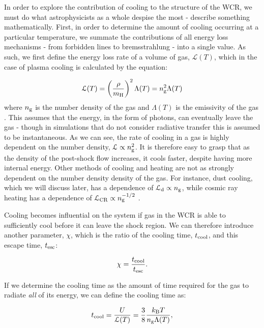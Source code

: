 In order to explore the contribution of cooling to the structure of the WCR, we must do what astrophysicists as a whole despise the most - describe something mathematically.
First, in order to determine the amount of cooling occurring at a particular temperature, we summate the contributions of all energy loss mechanisms - from forbidden lines to bremsstrahlung - into a single value.
As such, we first define the energy loss rate of a volume of gas, $\mathcal{L}(T)$, which in the case of plasma cooling is calculated by the equation:

\begin{equation}
  \label{eq:energylossrate}
  \mathcal{L}(T) = \left(\frac{\rho}{m_\text{H}}\right)^2 \Lambda(T) = n_\text{g}^2 \Lambda(T)
\end{equation}
\noindent
where $n_\text{g}$ is the number density of the gas and $\Lambda(T)$ is the emissivity of the gas \parencite{stevens_colliding_1992}.
This assumes that the energy, in the form of photons, can eventually leave the gas - though in simulations that do not consider radiative transfer this is assumed to be instantaneous.
As we can see, the rate of cooling in a gas is highly dependent on the number density, $\mathcal{L} \propto n_\text{g}^2$. 
It is therefore easy to grasp that as the density of the post-shock flow increases, it cools faster, despite having more internal energy.
Other methods of cooling and heating are not as strongly dependent on the number density density of the gas.
For instance, dust cooling, which we will discuss later, has a dependence of $\mathcal{L}_\text{d} \propto n_\text{g}$, while cosmic ray heating has a dependence of $\mathcal{L}_\text{CR} \propto n_\text{g}^{-1/2}$ \parencite{wienerCosmicRayHeating2013}.

Cooling becomes influential on the system if gas in the WCR is able to sufficiently cool before it can leave the shock region.
We can therefore introduce another parameter, $\chi$, which is the ratio of the cooling time, $t_\text{cool}$, and this escape time, $t_\text{esc}$:

\begin{equation}
  \chi = \frac{t_\text{cool}}{t_\text{esc}}.
\end{equation}

\noindent
If we determine the cooling time as the amount of time required for the gas to radiate \emph{all} of its energy, we can define the cooling time as:

\begin{equation}
  \label{eq:taucool}
  t_\text{cool} = \frac{U}{\mathcal{L}(T)} = \frac{3}{8} \frac{k_\text{B} T}{n_\text{g} \Lambda(T)},
\end{equation}

